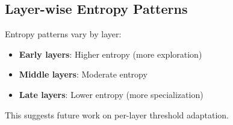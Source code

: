 \documentclass{article}
\begin{document}
\subsection{Layer-wise Entropy Patterns}

Entropy patterns vary by layer:
\begin{itemize}
    \item \textbf{Early layers}: Higher entropy (more exploration)
    \item \textbf{Middle layers}: Moderate entropy
    \item \textbf{Late layers}: Lower entropy (more specialization)
\end{itemize}

This suggests future work on per-layer threshold adaptation.
\end{document}
